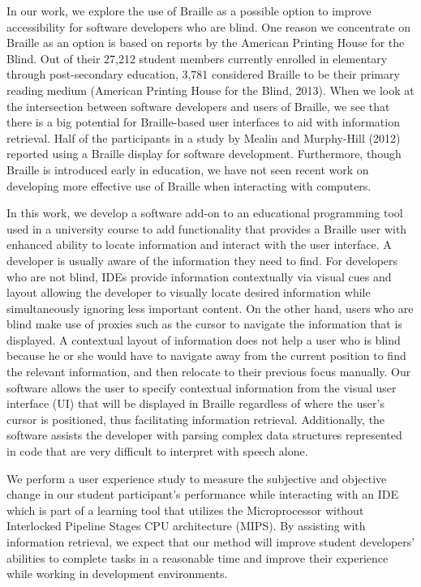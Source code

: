 \documentclass[11.5pt]{sig-alternate} %
\begin{document}
\begin{large}
In our work, we explore the use of Braille as a possible option to improve accessibility for software developers who are blind. One reason we concentrate on Braille as an option is based on reports by the American Printing House for the Blind. Out of their 27,212 student members currently enrolled in elementary through post-secondary education, 3,781 considered Braille to be their primary reading medium (American Printing House for the Blind, 2013). When we look at the intersection between software developers and users of Braille, we see that there is a big potential for Braille-based user interfaces to aid with information retrieval. Half of the participants in a study by Mealin and Murphy-Hill (2012) reported using a Braille display for software development. Furthermore, though Braille is introduced early in education, we have not seen recent work on developing more effective use of Braille when interacting with computers.

In this work, we develop a software add-on to an educational programming tool used in a university course to add functionality that provides a Braille user with enhanced ability to locate information and interact with the user interface. A developer is usually aware of the information they need to find. For developers who are not blind, IDEs provide information contextually via visual cues and layout allowing the developer to visually locate desired information while simultaneously ignoring less important content. On the other hand, users who are blind make use of proxies such as the cursor to navigate the information that is displayed. A contextual layout of information does not help a user who is blind because he or she would have to navigate away from the current position to find the relevant information, and then relocate to their previous focus manually. Our software allows the user to specify contextual information from the visual user interface (UI) that will be displayed in Braille regardless of where the user’s cursor is positioned, thus facilitating information retrieval. Additionally, the software assists the developer with parsing complex data structures represented in code that are very difficult to interpret with speech alone.

We perform a user experience study to measure the subjective and objective change in our student participant’s performance while interacting with an IDE which is part of a learning tool that utilizes the Microprocessor without Interlocked Pipeline Stages CPU architecture (MIPS). By assisting with information retrieval, we expect that our method will improve student developers’ abilities to complete tasks in a reasonable time and improve their experience while working in development environments.


\end{large}
\end{document}
